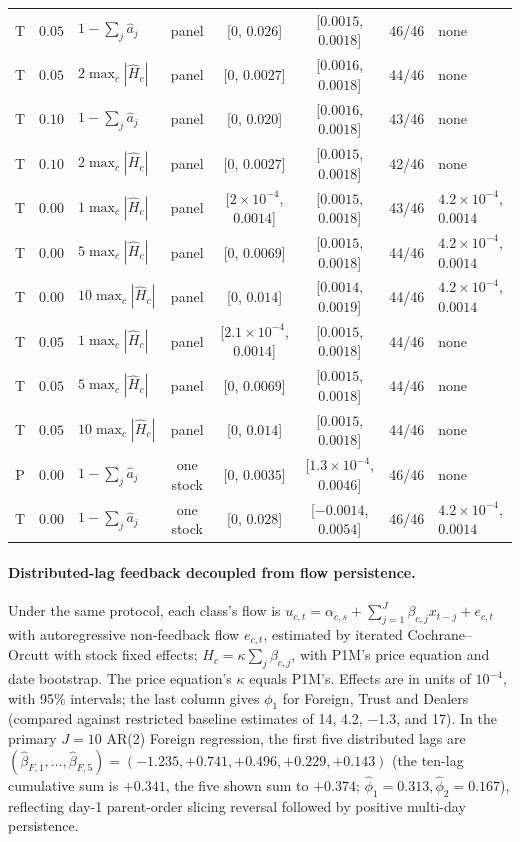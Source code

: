 \documentclass[12pt]{article}
\theoremstyle{definition}
\theoremstyle{remark}
\begin{document}
\begin{center}
\begin{tabular}{cclcccc>{\raggedright\arraybackslash}p{}}
T & $0.05$ & $1-\sum_j\hat a_j$ & panel & [$0$, $0.026$] & [$0.0015$, $0.0018$] & 46/46 & none\\
T & $0.05$ & $2\max_c|\hat H_c|$ & panel & [$0$, $0.0027$] & [$0.0016$, $0.0018$] & 44/46 & none\\
T & $0.10$ & $1-\sum_j\hat a_j$ & panel & [$0$, $0.020$] & [$0.0016$, $0.0018$] & 43/46 & none\\
T & $0.10$ & $2\max_c|\hat H_c|$ & panel & [$0$, $0.0027$] & [$0.0015$, $0.0018$] & 42/46 & none\\
T & $0.00$ & $1\max_c|\hat H_c|$ & panel & [$2\times10^{-4}$, $0.0014$] & [$0.0015$, $0.0018$] & 43/46 & $4.2\times10^{-4}$, $0.0014$\\
T & $0.00$ & $5\max_c|\hat H_c|$ & panel & [$0$, $0.0069$] & [$0.0015$, $0.0018$] & 44/46 & $4.2\times10^{-4}$, $0.0014$\\
T & $0.00$ & $10\max_c|\hat H_c|$ & panel & [$0$, $0.014$] & [$0.0014$, $0.0019$] & 44/46 & $4.2\times10^{-4}$, $0.0014$\\
T & $0.05$ & $1\max_c|\hat H_c|$ & panel & [$2.1\times10^{-4}$, $0.0014$] & [$0.0015$, $0.0018$] & 44/46 & none\\
T & $0.05$ & $5\max_c|\hat H_c|$ & panel & [$0$, $0.0069$] & [$0.0015$, $0.0018$] & 44/46 & none\\
T & $0.05$ & $10\max_c|\hat H_c|$ & panel & [$0$, $0.014$] & [$0.0015$, $0.0018$] & 44/46 & none\\
P & $0.00$ & $1-\sum_j\hat a_j$ & one stock & [$0$, $0.0035$] & [$1.3\times10^{-4}$, $0.0046$] & 46/46 & none\\
T & $0.00$ & $1-\sum_j\hat a_j$ & one stock & [$0$, $0.028$] & [$-0.0014$, $0.0054$] & 46/46 & $4.2\times10^{-4}$, $0.0014$\\
\bottomrule\end{tabular}
\end{center}


\paragraph{Distributed-lag feedback decoupled from flow persistence.} Under the same protocol, each class's flow is $u_{c,t}=\alpha_{c,s}+\sum_{j=1}^{J}\beta_{c,j}x_{t-j}+e_{c,t}$ with autoregressive non-feedback flow $e_{c,t}$, estimated by iterated Cochrane--Orcutt with stock fixed effects; $H_c=\kappa\sum_j\beta_{c,j}$, with P1M's price equation and date bootstrap. The price equation's $\kappa$ equals P1M's. Effects are in units of $10^{-4}$, with 95\% intervals; the last column gives $\phi_1$ for Foreign, Trust and Dealers (compared against restricted baseline estimates of 14, 4.2, $-$1.3, and 17). In the primary $J=10$ AR(2) Foreign regression, the first five distributed lags are $(\hat\beta_{F,1},\dots,\hat\beta_{F,5}) = (-1.235, +0.741, +0.496, +0.229, +0.143)$ (the ten-lag cumulative sum is $+0.341$, the five shown sum to $+0.374$; $\hat\phi_1 = 0.313, \hat\phi_2 = 0.167$), reflecting day-1 parent-order slicing reversal followed by positive multi-day persistence.
\end{document}
